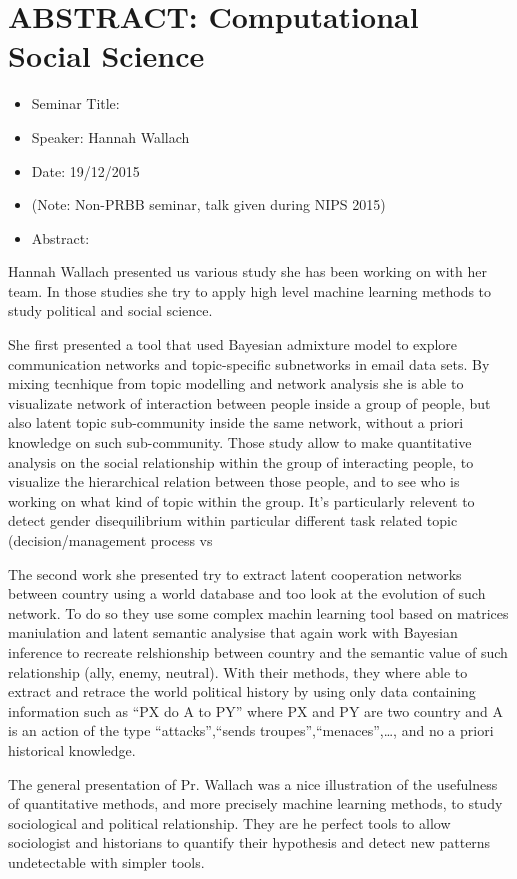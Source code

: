 \documentclass[10pt,letterpaper]{article}
\begin{document}
\section{ABSTRACT: Computational Social Science }
\begin{itemize}
    \item Seminar Title: 
    \item Speaker: Hannah Wallach 
    \item Date: 19/12/2015
    \item (Note: Non-PRBB seminar, talk given during NIPS 2015)
    \item Abstract:
\end{itemize}
Hannah Wallach presented us various study she has been working on with her team. In those studies she try to apply high level machine learning methods to study political and social science.

She first presented a tool that used Bayesian admixture model to explore communication networks and topic-specific subnetworks in email data sets.  By mixing tecnhique from topic modelling and network analysis she is able to visualizate network of interaction between people inside a group of people, but also latent topic sub-community inside the same network, without a priori knowledge on such sub-community. Those study allow to make quantitative analysis on the social relationship within the group of interacting people, to visualize the hierarchical relation between those people, and to see who is working on what kind of topic within the group. It's particularly relevent to detect gender disequilibrium within particular different task related topic (decision/management process vs  

The second work she presented try to extract latent cooperation networks between country using a world database and too look at the evolution of such network. To do so they use some complex machin learning tool based on matrices maniulation and latent semantic analysise that again work with Bayesian inference to recreate relshionship between country and the semantic value of such relationship (ally, enemy, neutral). With their methods, they where able to extract and retrace the world political history by using only data containing information such as ``PX do A to PY'' where PX and PY are two country and A is an action of the type ``attacks'',``sends troupes'',``menaces'',\ldots, and no a priori historical knowledge.

The general presentation of Pr. Wallach was a nice illustration of the usefulness of quantitative methods, and more precisely machine learning methods, to study sociological and political relationship. They are he perfect tools to allow sociologist and historians to quantify their hypothesis and detect new patterns undetectable with simpler tools.
\end{document}
